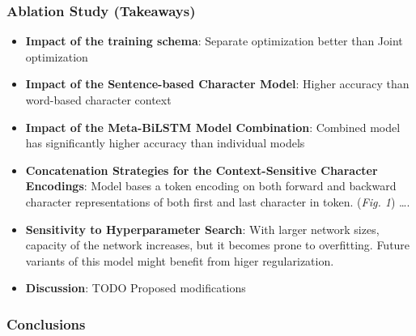 \documentclass[11pt]{article}
\begin{document}
\subsubsection{Ablation Study (Takeaways)}
\label{sec:org16750c4}
\begin{itemize}
\item \textbf{Impact of the training schema}: Separate optimization better than Joint optimization
\item \textbf{Impact of the Sentence-based Character Model}: Higher accuracy than word-based character context
\item \textbf{Impact of the Meta-BiLSTM Model Combination}: Combined model has significantly higher accuracy than individual models
\item \textbf{Concatenation Strategies for the Context-Sensitive Character Encodings}: Model bases a token encoding on both forward and backward character representations of both first and last character in token. (\emph{Fig. 1}) \ldots{}.
\item \textbf{Sensitivity to Hyperparameter Search}: With larger network sizes, capacity of the network increases, but it becomes prone to overfitting. Future variants of this model might benefit from higer regularization.
\item \textbf{Discussion}: TODO Proposed modifications
\end{itemize}
\subsubsection{Conclusions}
\label{sec:orgc52981e}
\end{document}
